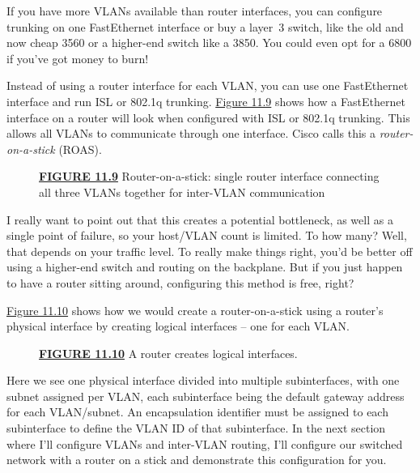 If you have more VLANs available than router interfaces, you can
configure trunking on one FastEthernet interface or buy a layer~3
switch, like the old and now cheap 3560 or a higher-end switch like a
3850. You could even opt for a 6800 if you've got money to burn!

Instead of using a router interface for each VLAN, you can use one
FastEthernet interface and run ISL or 802.1q trunking.
\protect\hyperlink{c11.xhtmlux5cux23figure11-9}{Figure 11.9} shows how a
FastEthernet interface on a
router will look when
configured with ISL or 802.1q trunking. This allows all VLANs to
communicate through one interface. Cisco calls this a \emph{router-on-a-stick}
(ROAS).

\begin{figure}
\centering
\caption{{\protect\hyperlink{c11.xhtmlux5cux23figureanchor11-9}{\textbf{FIGURE
11.9}} Router-on-a-stick: single router interface connecting all three
VLANs together for inter-VLAN communication}}
\end{figure}

I really want to point out that this creates a potential bottleneck, as
well as a single point of failure, so your host/VLAN count is limited.
To how many? Well, that depends on your traffic level. To really make
things right, you'd be better off using a higher-end switch and routing
on the backplane. But if you just happen to have a router sitting
around, configuring this method is free, right?

\protect\hyperlink{c11.xhtmlux5cux23figure11-10}{Figure 11.10} shows how
we would create a router-on-a-stick using a router's physical interface
by creating logical interfaces -- one for each VLAN.

\begin{figure}
\centering
\caption{{\protect\hyperlink{c11.xhtmlux5cux23figureanchor11-10}{\textbf{FIGURE
11.10}} A router creates logical interfaces.}}
\end{figure}

Here we see one physical interface divided into multiple subinterfaces,
with one subnet assigned per VLAN, each subinterface being the default
gateway address for each VLAN/subnet. An encapsulation identifier must
be assigned to each subinterface to define the VLAN ID of that
subinterface. In the next section where I'll configure VLANs and
inter-VLAN routing, I'll configure our switched network with a router on
a stick and demonstrate this configuration for you.

